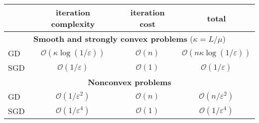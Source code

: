 \documentclass{standalone}
\begin{document}
\begin{tabular}{l|c|c|c}
\toprule
 & iteration complexity & iteration cost & total \\
\midrule
\multicolumn{4}{c}{\textbf{Smooth and strongly convex problems} ($\kappa = L/\mu$)} \\
\midrule
GD & $\mathcal{O}(\kappa \log(1/\varepsilon))$ & $\mathcal{O}(n)$ & $\mathcal{O}(n\kappa \log(1/\varepsilon))$ \\
SGD & $\mathcal{O}(1/\varepsilon)$ & $\mathcal{O}(1)$ & $\mathcal{O}(1/\varepsilon)$ \\
\midrule
\multicolumn{4}{c}{\textbf{Nonconvex problems}} \\
\midrule
GD & $\mathcal{O}(1/\varepsilon^2)$ & $\mathcal{O}(n)$ & $\mathcal{O}(n/\varepsilon^2)$ \\
SGD & $\mathcal{O}(1/\varepsilon^4)$ & $\mathcal{O}(1)$ & $\mathcal{O}(1/\varepsilon^4)$ \\
\bottomrule
\end{tabular}
\end{document}
